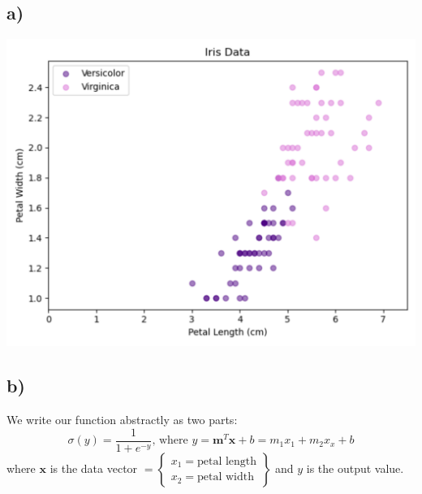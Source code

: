 \documentclass{article} %
\begin{document}
\subsection*{a)}
\begin{center}
    \includegraphics[scale=0.40]{1a_plot.png}
\end{center}
\subsection*{b)}
We write our function abstractly as two parts:
\begin{equation*}
    \sigma(y)=\frac{1}{1+e^{-y}}\text{, where }y=\mathbf{m}^{T}\mathbf{x}+b =m_{1}x_{1} + m_{2}x_{x} + b
\end{equation*}
where $\mathbf{x}$ is the data vector $=\begin{Bmatrix}x_{1}=\text{petal length}\\x_{2}=\text{petal width}\end{Bmatrix}$ and $y$ is the output value.\\
\end{document}
